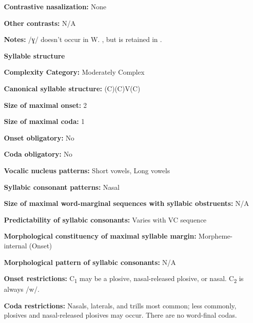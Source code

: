 \textbf{Contrastive nasalization:} None



\textbf{Other contrasts:} N/A



\textbf{Notes:} /ɣ/ doesn’t occur in W. , but is retained in  \citep[12]{Yallop1977}.



\textbf{Syllable structure}



\textbf{Complexity Category:} Moderately Complex



\textbf{Canonical syllable structure:} (C)(C)V(C) \citep[41-5]{Yallop1977}



\textbf{Size of maximal onset:} 2



\textbf{Size of maximal coda:} 1



\textbf{Onset obligatory:} No



\textbf{Coda obligatory:} No



\textbf{Vocalic nucleus patterns:} Short vowels, Long vowels



\textbf{Syllabic consonant patterns:} Nasal



\textbf{Size of maximal word{}-marginal sequences with syllabic obstruents:} N/A



\textbf{Predictability of syllabic consonants:} Varies with VC sequence



\textbf{Morphological constituency of maximal syllable margin:} Morpheme-internal (Onset)



\textbf{Morphological pattern of syllabic consonants:} N/A



\textbf{Onset restrictions:} C\textsubscript{1} may be a plosive, nasal-released plosive, or nasal. C\textsubscript{2} is always /w/.



\textbf{Coda restrictions:} Nasals, laterals, and trills most common; less commonly, plosives and nasal-released plosives may occur. There are no word-final codas.



